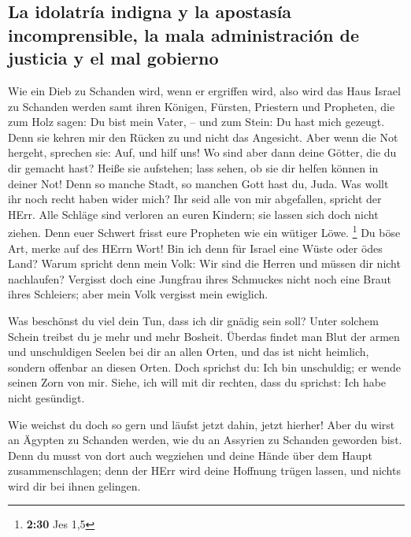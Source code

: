 \hypertarget{la-idolatruxeda-indigna-y-la-apostasuxeda-incomprensible-la-mala-administraciuxf3n-de-justicia-y-el-mal-gobierno}{%
\subsection{La idolatría indigna y la apostasía incomprensible, la mala
administración de justicia y el mal
gobierno}\label{la-idolatruxeda-indigna-y-la-apostasuxeda-incomprensible-la-mala-administraciuxf3n-de-justicia-y-el-mal-gobierno}}

 Wie ein Dieb zu Schanden wird, wenn er ergriffen wird,
also wird das Haus Israel zu Schanden werden samt ihren Königen,
Fürsten, Priestern und Propheten,  die zum Holz sagen: Du
bist mein Vater, -- und zum Stein: Du hast mich gezeugt. Denn sie kehren
mir den Rücken zu und nicht das Angesicht. Aber wenn die Not hergeht,
sprechen sie: Auf, und hilf uns!  Wo sind aber dann deine
Götter, die du dir gemacht hast? Heiße sie aufstehen; lass sehen, ob sie
dir helfen können in deiner Not! Denn so manche Stadt, so manchen Gott
hast du, Juda.  Was wollt ihr noch recht haben wider
mich? Ihr seid alle von mir abgefallen, spricht der HErr.
 Alle Schläge sind verloren an euren Kindern; sie lassen
sich doch nicht ziehen. Denn euer Schwert frisst eure Propheten wie ein
wütiger Löwe. \footnote{\textbf{2:30} Jes 1,5}  Du böse
Art, merke auf des HErrn Wort! Bin ich denn für Israel eine Wüste oder
ödes Land? Warum spricht denn mein Volk: Wir sind die Herren und müssen
dir nicht nachlaufen?  Vergisst doch eine Jungfrau ihres
Schmuckes nicht noch eine Braut ihres Schleiers; aber mein Volk vergisst
mein ewiglich.

 Was beschönst du viel dein Tun, dass ich dir gnädig sein
soll? Unter solchem Schein treibst du je mehr und mehr Bosheit.
 Überdas findet man Blut der armen und unschuldigen
Seelen bei dir an allen Orten, und das ist nicht heimlich, sondern
offenbar an diesen Orten.  Doch sprichst du: Ich bin
unschuldig; er wende seinen Zorn von mir. Siehe, ich will mit dir
rechten, dass du sprichst: Ich habe nicht gesündigt.

 Wie weichst du doch so gern und läufst jetzt dahin,
jetzt hierher! Aber du wirst an Ägypten zu Schanden werden, wie du an
Assyrien zu Schanden geworden bist.  Denn du musst von
dort auch wegziehen und deine Hände über dem Haupt zusammenschlagen;
denn der HErr wird deine Hoffnung trügen lassen, und nichts wird dir bei
ihnen gelingen.

